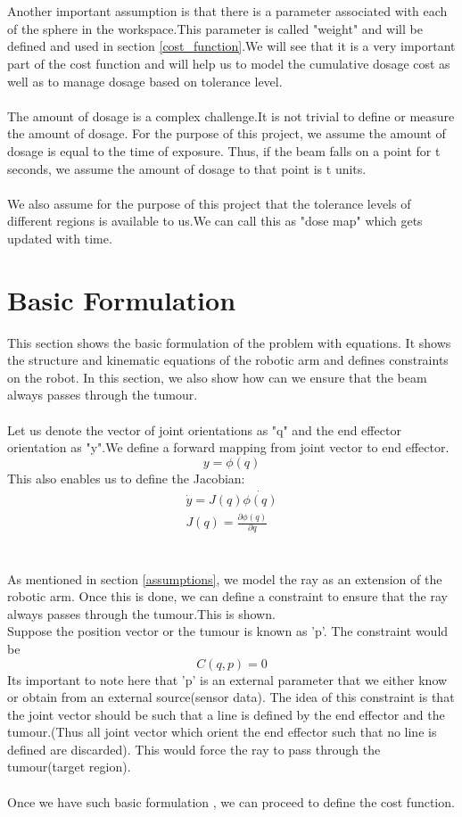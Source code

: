 \documentclass[10pt]{report}
\begin{document}
\\
\\
Another important assumption is that there is a parameter associated with each of the sphere in the workspace.This parameter is called "weight" and will be defined and used in section \ref{cost_function}.We will see that it is a very important part of the cost function and will help us to model the cumulative dosage cost as well as to manage dosage based on tolerance level. 
\\
\\
The amount of dosage is a complex challenge.It is not trivial to define or measure the amount of dosage. For the purpose of this project, we assume the amount of dosage is equal to the time of exposure. Thus, if the beam falls on a point for t seconds, we assume the amount of dosage to that point is t units.
\\
\\
We also assume for the purpose of this project that the tolerance levels of different regions is available to us.We can call this as "dose map" which gets updated with time.
\section{Basic Formulation}
This section shows the basic formulation of the problem with equations. It shows the structure and kinematic equations of the robotic arm and defines constraints on the robot. In this section, we also show how can we ensure that the beam always passes through the tumour.
\\
\\
Let us denote the vector of joint orientations as "q" and the end effector orientation as "y".We define a forward mapping from joint vector to end effector.
\begin{equation}
y=\phi(q)
\end{equation}
This also enables us to define the Jacobian:
\begin{eqnarray}
\dot{y}=J(q) \dot{\phi(q)} \\
J(q)= \frac{\partial \phi(q)}{ \partial q}
\end{eqnarray}
\\
\\
As mentioned in section \ref{assumptions}, we model the ray as an extension of the robotic arm. Once this is done, we can define a constraint to ensure that the ray always passes through the tumour.This is shown.
\\
Suppose the position vector or the tumour is known as 'p'.
The constraint would be 
\begin{equation}
C(q,p)=0
\end{equation}
Its important to note here that 'p' is an external parameter that we either know or obtain from an external source(sensor data). The idea of this constraint is that the joint vector should be such that a line is defined by the end effector and the tumour.(Thus all joint vector which orient the end effector such that no line is defined are discarded).
This would force the ray to pass through the tumour(target region).
\\
\\
Once we have such basic formulation , we can proceed to define the cost function.
\end{document}
